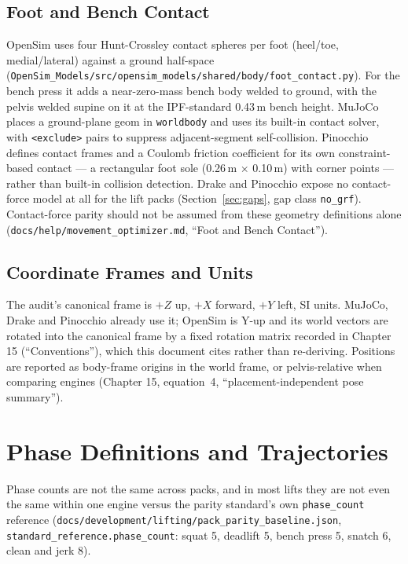 \documentclass[11pt,a4paper]{article}
\begin{document}
\subsection{Foot and Bench Contact}
OpenSim uses four Hunt-Crossley contact spheres per foot (heel/toe,
medial/lateral) against a ground half-space
(\texttt{OpenSim\_Models/src/opensim\_models/shared/body/foot\_contact.py}).
For the bench press it adds a near-zero-mass bench body welded to ground,
with the pelvis welded supine on it at the IPF-standard 0.43\,m bench height.
MuJoCo places a ground-plane geom in \texttt{worldbody} and uses its built-in
contact solver, with \texttt{<exclude>} pairs to suppress adjacent-segment
self-collision. Pinocchio defines contact frames and a Coulomb friction
coefficient for its own constraint-based contact --- a rectangular foot sole
(0.26\,m $\times$ 0.10\,m) with corner points --- rather than built-in
collision detection. Drake and Pinocchio expose no contact-force model at
all for the lift packs (Section~\ref{sec:gaps}, gap class \texttt{no\_grf}).
Contact-force parity should not be assumed from these geometry definitions
alone (\texttt{docs/help/movement\_optimizer.md}, ``Foot and Bench Contact'').

\subsection{Coordinate Frames and Units}
The audit's canonical frame is $+Z$ up, $+X$ forward, $+Y$ left, SI units.
MuJoCo, Drake and Pinocchio already use it; OpenSim is Y-up and its world
vectors are rotated into the canonical frame by a fixed rotation matrix
recorded in Chapter 15 (``Conventions''), which this document cites rather
than re-deriving. Positions are reported as body-frame origins in the world
frame, or pelvis-relative when comparing engines (Chapter 15, equation~4,
``placement-independent pose summary'').

\section{Phase Definitions and Trajectories}
Phase counts are not the same across packs, and in most lifts they are not
even the same within one engine versus the parity standard's own
\texttt{phase\_count} reference
(\texttt{docs/development/lifting/pack\_parity\_baseline.json},
\texttt{standard\_reference.phase\_count}: squat 5, deadlift 5, bench press 5,
snatch 6, clean and jerk 8).
\end{document}
